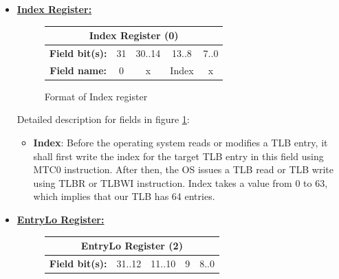 \documentclass[oneside]{book}
\begin{document}
\begin{itemize}

\item \textbf{\underline{Index Register:}}\\

\begin{figure}[H]
\begin{center}
\begin{tabular}{|c|c|c|c|c|}

\hline \multicolumn{5}{|c|}{Index Register (0)} \\

\hline \textbf{Field bit(s):} & 31 & 30..14 & 13..8 & 7..0 \\

\hline \textbf{Field name:}   & 0  & x      & Index & x    \\

\hline

\end{tabular}

\end{center}
\caption{Format of Index register}
\label{index_reg}
\end{figure}

Detailed description for fields in figure \ref{index_reg}:

\begin{itemize}

\item \textbf{Index}: Before the operating system reads
      or modifies a TLB entry, it shall first write the
      index for the target TLB entry in this field using
      MTC0 instruction. After then, the OS issues a TLB
      read or TLB write using TLBR or TLBWI instruction.
      Index takes a value from 0 to 63, which implies
      that our TLB has 64 entries.

\end{itemize}

\item \textbf{\underline{EntryLo Register:}}\\

\begin{figure}[H]
\begin{center}
\begin{tabular}{|c|c|c|c|c|}

\hline \multicolumn{5}{|c|}{EntryLo Register (2)} \\

\hline \textbf{Field bit(s):} & 31..12 & 11..10 & 9 & 8..0 \\


\end{tabular}
\end{center}
\end{figure}
\end{itemize}
\end{document}
